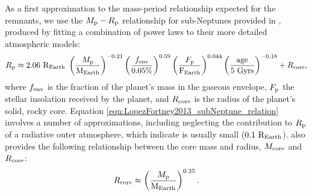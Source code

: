 \documentclass[smallcondensed]{svjour3}    %
\begin{document}
As a first approximation to the mass-period relationship expected for the remnants, we use the $M_{\rm p}-R_{\rm p}$ relationship for sub-Neptunes provided in \cite{}, produced by fitting a combination of power laws to their more detailed atmospheric models:
\begin{equation}
R_{\rm p} \approx 2.06\ {\rm R_{Earth}}\ \left( \dfrac{M_{\rm p}}{\rm M_{Earth}} \right)^{-0.21} \left( \dfrac{f_{\rm env}}{0.05\%} \right)^{0.59} \left( \dfrac{F_{\rm p}}{\rm F_{Earth}} \right)^{0.044} \left( \dfrac{\rm age}{\rm 5\ Gyrs} \right)^{-0.18} + R_{\rm core},
\label{eqn:LopezFortney2013_subNeptune_relation}
\end{equation}
where $f_{\rm env}$ is the fraction of the planet's mass in the gaseous envelope, $F_{\rm p}$ the stellar insolation received by the planet, and $R_{\rm core}$ is the radius of the planet's solid, rocky core. Equation \ref{eqn:LopezFortney2013_subNeptune_relation} involves a number of approximations, including neglecting the contribution to $R_{\rm p}$ of a radiative outer atmosphere, which \cite{} indicate is usually small ($0.1\ {\rm R_{Earth}}$). \cite{} also provides the following relationship between the core mass and radius, $M_{\rm core}$ and $R_{\rm core}$:
\begin{equation}
R_{\rm core} \approx \left( \dfrac{M_{\rm p}}{\rm M_{Earth}} \right)^{0.25}.
\label{eqn:LopezFortney2013_core_relation}
\end{equation}





\end{document}
